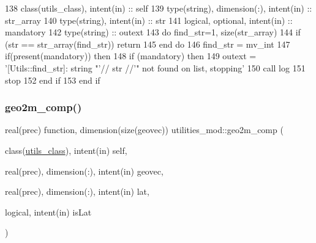\begin{DoxyCode}
138     \textcolor{keywordtype}{class}(utils\_class), \textcolor{keywordtype}{intent(in)} :: self
139     \textcolor{keywordtype}{type}(string), \textcolor{keywordtype}{dimension(:)}, \textcolor{keywordtype}{intent(in)} :: str\_array
140     \textcolor{keywordtype}{type}(string), \textcolor{keywordtype}{intent(in)} :: str
141     \textcolor{keywordtype}{logical}, \textcolor{keywordtype}{optional}, \textcolor{keywordtype}{intent(in)} :: mandatory
142     \textcolor{keywordtype}{type}(string) :: outext
143     \textcolor{keywordflow}{do} find\_str=1, \textcolor{keyword}{size}(str\_array)
144         \textcolor{keywordflow}{if} (str == str\_array(find\_str)) \textcolor{keywordflow}{return}
145 \textcolor{keywordflow}{    end do}
146     find\_str = mv\_int
147     \textcolor{keywordflow}{if}(\textcolor{keyword}{present}(mandatory)) \textcolor{keywordflow}{then}
148         \textcolor{keywordflow}{if} (mandatory) \textcolor{keywordflow}{then}
149             outext = \textcolor{stringliteral}{'[Utils::find\_str]: string "'}// str //\textcolor{stringliteral}{'" not found on list, stopping'}
150             \textcolor{keyword}{call }log%
151             stop
152 \textcolor{keywordflow}{        end if}
153 \textcolor{keywordflow}{    end if}
\end{DoxyCode}
\mbox{\label{namespaceutilities__mod_a063ca10c2c57dc186ad0db0337fef4f9}} 
\subsubsection{\texorpdfstring{geo2m\+\_\+comp()}{geo2m\_comp()}}
{\footnotesize\ttfamily real(prec) function, dimension(size(geovec)) utilities\+\_\+mod\+::geo2m\+\_\+comp (\begin{DoxyParamCaption}\item[{class(\mbox{\hyperlink{structutilities__mod_1_1utils__class}{utils\+\_\+class}}), intent(in)}]{self,  }\item[{real(prec), dimension(\+:), intent(in)}]{geovec,  }\item[{real(prec), dimension(\+:), intent(in)}]{lat,  }\item[{logical, intent(in)}]{is\+Lat }\end{DoxyParamCaption})\hspace{0.3cm}{\ttfamily [private]}}



